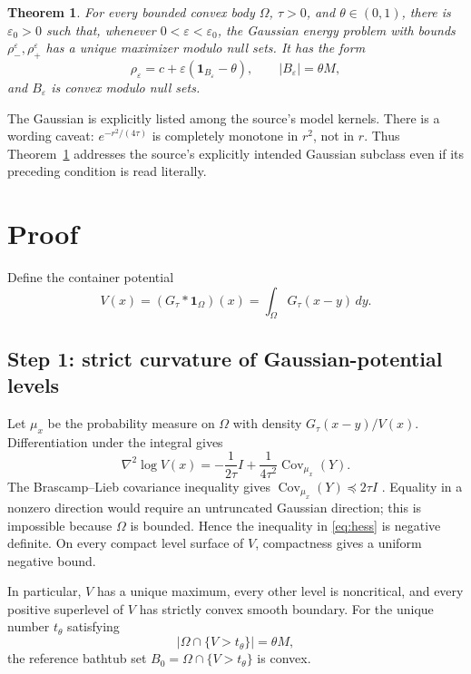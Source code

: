 \documentclass[11pt]{article}
\newtheorem{theorem}{Theorem}
\newcommand{\1}{\mathbf 1}
\begin{document}
\begin{theorem}\label{thm:main}
For every bounded convex body $\Omega$, $\tau>0$, and
$\theta\in(0,1)$, there is $\varepsilon_0>0$ such that, whenever
$0<\varepsilon<\varepsilon_0$, the Gaussian energy problem with bounds
$\rho_-^{\varepsilon},\rho_+^{\varepsilon}$ has a unique maximizer modulo
null sets.  It has the form
\[
 \rho_\varepsilon=c+\varepsilon(\1_{B_\varepsilon}-\theta),
 \qquad |B_\varepsilon|=\theta M,
\]
and $B_\varepsilon$ is convex modulo null sets.
\end{theorem}

The Gaussian is explicitly listed among the source's model kernels.  There is
a wording caveat: $e^{-r^2/(4\tau)}$ is completely monotone in $r^2$, not in
$r$.  Thus Theorem~\ref{thm:main} addresses the source's explicitly intended
Gaussian subclass even if its preceding condition is read literally.

\section{Proof}

Define the container potential
\[
 V(x)=(G_\tau*\1_\Omega)(x)=\int_\Omega G_\tau(x-y)\,dy.
\]

\subsection*{Step 1: strict curvature of Gaussian-potential levels}

Let $\mu_x$ be the probability measure on $\Omega$ with density
$G_\tau(x-y)/V(x)$.  Differentiation under the integral gives
\begin{equation}\label{eq:hess}
 \nabla^2\log V(x)
 =-\frac1{2\tau}I+\frac1{4\tau^2}\operatorname{Cov}_{\mu_x}(Y).
\end{equation}
The Brascamp--Lieb covariance inequality gives
$\operatorname{Cov}_{\mu_x}(Y)\preceq2\tau I$ \cite{BL}.  Equality in a
nonzero direction would require an untruncated Gaussian direction; this is
impossible because $\Omega$ is bounded.  Hence the inequality in
\eqref{eq:hess} is negative definite.  On every compact level surface of
$V$, compactness gives a uniform negative bound.

In particular, $V$ has a unique maximum, every other level is noncritical,
and every positive superlevel of $V$ has strictly convex smooth boundary.
For the unique number $t_\theta$ satisfying
\[
 |\Omega\cap\{V>t_\theta\}|=\theta M,
\]
the reference bathtub set
$B_0=\Omega\cap\{V>t_\theta\}$ is convex.
\end{document}
